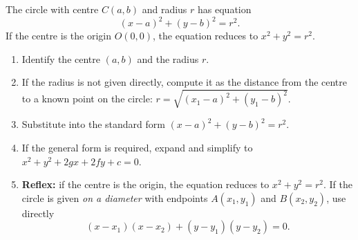 \documentclass[11pt]{article}
\newcommand{\cle}[1]{{\popxbold\color{popdark}#1}}
\newcommand{\legende}[1]{\par\vspace{6pt}{\popsemi\fontsize{9}{11.5}\selectfont\color{popmuted}#1}}
\begin{document}
\begin{propriete}
The circle with centre $C(a,b)$ and radius $r$ has equation
\[
(x-a)^2+(y-b)^2=r^2.
\]
If the centre is the origin $O(0,0)$, the equation reduces to $x^2+y^2=r^2$.
\end{propriete}

\begin{popfigure}
\legende{The standard circle: $(x-a)^2+(y-b)^2=r^2$}
\end{popfigure}

\begin{methode}
\begin{enumerate}
\item Identify the \cle{centre} $(a,b)$ and the \cle{radius} $r$.
\item If the radius is not given directly, compute it as the distance from the centre to a known point on the circle:
      $r=\sqrt{(x_1-a)^2+(y_1-b)^2}$.
\item Substitute into the standard form $(x-a)^2+(y-b)^2=r^2$.
\item If the \cle{general form} is required, expand and simplify to $x^2+y^2+2gx+2fy+c=0$.
\item \textbf{Reflex:} if the centre is the origin, the equation reduces to $x^2+y^2=r^2$. If the circle is given \emph{on a diameter} with endpoints $A(x_1,y_1)$ and $B(x_2,y_2)$, use directly
      \[
      (x-x_1)(x-x_2)+(y-y_1)(y-y_2)=0.
      \]
\end{enumerate}
\end{methode}
\end{document}

